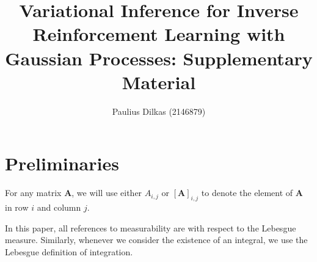 \documentclass{article}
\title{Variational Inference for Inverse Reinforcement Learning with Gaussian
  Processes: Supplementary Material}
\author{Paulius Dilkas (2146879)}
\theoremstyle{definition}
\begin{document}
\maketitle

\section{Preliminaries}

For any matrix $\mathbf{A}$, we will use either $A_{i,j}$ or
$[\mathbf{A}]_{i,j}$ to denote the element of $\mathbf{A}$ in row $i$ and column
$j$.

In this paper, all references to measurability are with respect to the Lebesgue
measure. Similarly, whenever we consider the existence of an integral, we use
the Lebesgue definition of integration.

\end{document}
